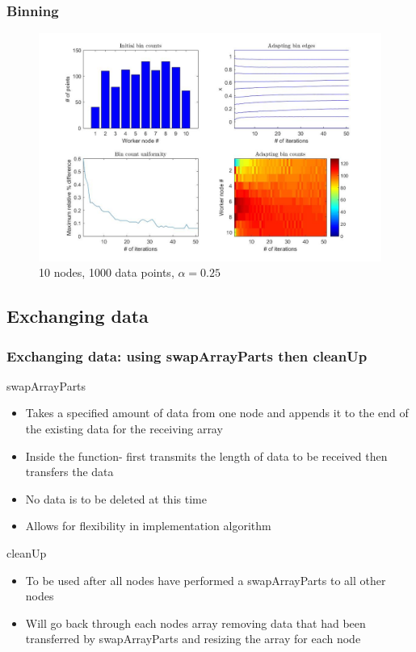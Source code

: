 \documentclass{beamer}
\begin{document}
\begin{frame}
	\frametitle{Binning}
	
	\begin{figure}[!htb]
		\centering
		\vspace{-5pt}
		\includegraphics[scale = 0.25]{AdaptiveBinning_10Nodes_1000Lines_0250alpha}
		\vspace{-10pt}
		\caption{10 nodes, 1000 data points, $\alpha = 0.25$}
	\end{figure}
\end{frame}




\subsection{Exchanging data}

\begin{frame}    
    \frametitle{Exchanging data: using swapArrayParts then cleanUp}
    
    \begin{block}{swapArrayParts}
        \begin{itemize}
            \item Takes a specified amount of data from one node and appends it to the end of the existing data for the receiving array
            \item Inside the function- first transmits the length of data to be received then transfers the data
            \item No data is to be deleted at this time
            \item Allows for flexibility in implementation algorithm
        \end{itemize}
    \end{block}
    
    \begin{block}{cleanUp}
        \begin{itemize}
            \item To be used after all nodes have performed a swapArrayParts to all other nodes
            \item Will go back through each nodes array removing data that had been transferred by swapArrayParts and resizing the array for each node
        \end{itemize}
    \end{block}
\end{frame}
\end{document}
